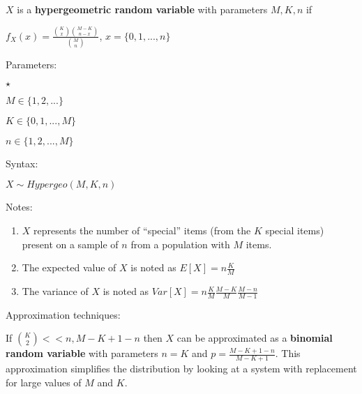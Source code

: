 \documentclass{article}
\begin{document}
$X$ is a \textbf{hypergeometric random variable} with parameters \textbf{$M, K, n$} if\\
\par
$f_X(x) = \frac{ { K \choose x} {M-K \choose n-x} }{ {M \choose n} }$,     $x=\{0,1,...,n\}$	\\
\par
Parameters:\\
\par
\begin{list}{$\star$ }{}
\item $M \in \{1,2,...\}$
\item $K \in \{0,1,...,M\}$
\item $n \in \{1,2,...,M\}$
\end{list}
\par
Syntax:\\
\par
$X\sim Hypergeo(M,K,n)$\\
\par
Notes:\\
\par
\begin{enumerate}

\item $X$ represents the number of ``special'' items (from the $K$ special items) present on a sample of  $n$ from a population with $M$ items.
\item The expected value of $X$ is noted as $E[X] = n \frac{K}{M}$
\item The variance of $X$ is noted as $Var[X] = n \frac{K}{M} \frac{M-K}{M} \frac{M-n}{M-1}$

\end{enumerate}

Approximation techniques:

If ${K \choose 2} << n, M-K+1-n$ then $X$ can be approximated as a \textbf{binomial random variable} with parameters $n=K$ and $p=\frac{M-K+1-n}{M-K+1}$.
This approximation simplifies the distribution by looking at a system with replacement for large values of $M$ and $K$.
\end{document}
